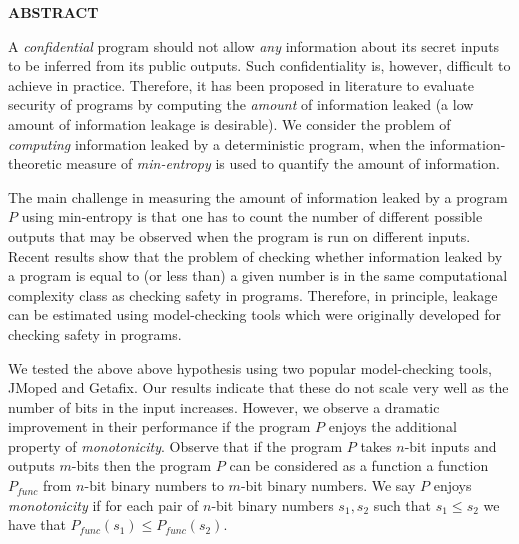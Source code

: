 \newpage
{}

\centerline{\bf \large ABSTRACT}
\vskip 10mm 

A \emph{confidential} program should not allow \emph{any} information about its secret inputs to be inferred from its public outputs. Such confidentiality is, however, difficult to achieve in practice. Therefore, it has been proposed in literature to evaluate security of programs by computing the \emph{amount} of information leaked (a low amount of information leakage is desirable). 
We consider the problem of \emph{computing} 
information leaked by a deterministic  program,  when the information-theoretic measure of \emph{min-entropy} is used to quantify the amount of information. 

The main challenge in measuring the amount of  information leaked by a program $P$ using min-entropy is that one has to count the number of different possible outputs that may be observed when the program is run on different inputs. Recent results show that the problem of checking whether information leaked by a program is equal to  (or less than) a given number is in the same computational complexity class as checking safety in  programs.  Therefore, in principle,   leakage can be estimated using model-checking tools which were  originally developed for checking safety in programs.  
 
We tested the above above hypothesis using two popular model-checking tools, JMoped and Getafix. Our results indicate that these   do not scale very well as  the number of bits
in the input increases.  However, we observe a dramatic improvement in their performance  if the program $P$ enjoys the additional property of \emph{monotonicity}. Observe that if the program $P$ takes $n$-bit inputs and outputs $m$-bits then the program $P$ can be considered as a function a function $P_{func}$ from $n$-bit binary numbers to $m$-bit binary numbers.    We say $P$ enjoys   
\emph{monotonicity}  if for each pair of $n$-bit  binary numbers $s_1, s_2$  such that  $s_1\leq s_2$ we have that $P_{func}(s_1) \leq P_{func}(s_2).$


  